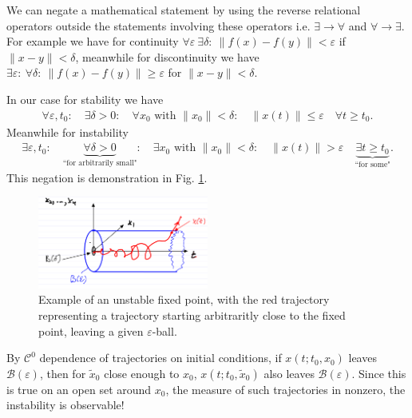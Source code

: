 \begin{remark}[]
	We can negate a mathematical statement by using the reverse relational operators outside the statements involving these operators i.e. $ \exists \to \forall $ and $\forall \to \exists $. For example we have for continuity $\forall \varepsilon\ \exists \delta:\  \|f( {x}) - f( {y}) \| < \varepsilon$ if $ \| {x}- {y} \|<\delta$, meanwhile for discontinuity we have  $\exists \varepsilon:\ \forall \delta:\  \|f( {x}) - f( {y}) \| \geq  \varepsilon$ for $ \| {x}- {y} \|< \delta$.

	In our case for stability we have
	\begin{align}
		\forall \varepsilon,t_0: \quad \exists \delta>0: \quad \forall  {x}_0  \textrm{ with }  \| {x}_0 \| < \delta: \quad  \| {x}(t) \|\leq \varepsilon \quad \forall t\geq t_0.
	\end{align}
Meanwhile for instability 
\begin{align}
	\exists \varepsilon,t_0:\quad \underbrace{\forall \delta>0}_{ \textrm{``for arbitrarily small"} }:\quad \exists  {x}_0  \textrm{ with }  \| {x}_0 \|<\delta: \quad  \| {x}(t) \|>\varepsilon \quad \underbrace{\exists t\geq t_0}_{ \textrm{``for some"} }.
\end{align}
This negation is demonstration in Fig. \ref{fig:instable_def}.
\begin{figure}[h!]
	\centering
	\includegraphics[width=0.5\textwidth]{figures/ch2/6unstable_def.png}
	\caption{Example of an unstable fixed point, with the red trajectory representing a trajectory starting arbitraritly close to the fixed point, leaving a given $\varepsilon$-ball.}
	\label{fig:instable_def}
\end{figure}
\end{remark}

\begin{remark}[]
	By $\mathcal{C}^0$ dependence of trajectories on initial conditions, if $ {x}(t;t_0, {x}_0)$ leaves $\mathcal{B}(\varepsilon)$, then for $\tilde{ {x}}_0$ close enough to $ {x}_0$, $ {x}(t;t_0,\tilde{ {x}}_0)$ also leaves $\mathcal{B}(\varepsilon)$. Since this is true on an open set around ${x}_0$, the measure of such trajectories in nonzero, the instability is observable!
\end{remark}

